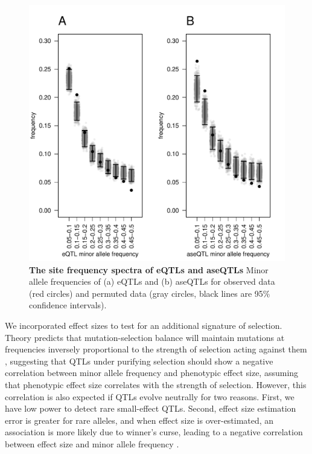\begin{figure}[ht!]
      \centering
       \includegraphics[width=\linewidth]{Ch3Fig3}
    \caption{\textbf{The site frequency spectra of eQTLs and aseQTLs} Minor allele frequencies of (a) eQTLs and (b) aseQTLs for observed data (red circles) and permuted data (gray circles, black lines are 95\% confidence intervals).}
    \label{fig:3fig3}
\end{figure}

We incorporated effect sizes to test for an additional signature of selection. Theory predicts that mutation-selection balance will maintain mutations at frequencies inversely proportional to the strength of selection acting against them \citep{Haldane1927-pj}, suggesting that QTLs under purifying selection should show a negative correlation between minor allele frequency and phenotypic effect size, assuming that phenotypic effect size correlates with the strength of selection. However, this correlation is also expected if QTLs evolve neutrally for two reasons. First, we have low power to detect rare small-effect QTLs. Second, effect size estimation error is greater for rare alleles, and when effect size is over-estimated, an association is more likely due to winner’s curse, leading to a negative correlation between effect size and minor allele frequency \citep{Capen1971-bs}. 

